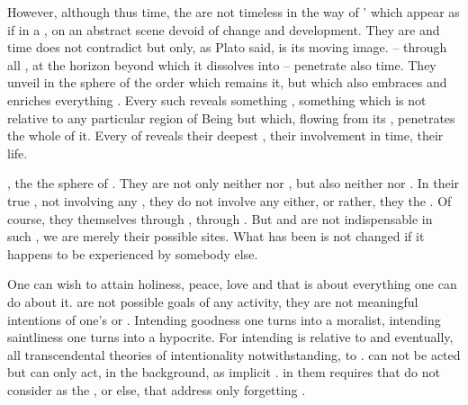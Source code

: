 However, although  thus time, the  are not
timeless in the way of ' which appear as if in a ,
on an abstract scene devoid of change and development.  They are 
and time does not contradict  but only, as Plato said, is its
moving image.
 --  through all , at the horizon
beyond which it dissolves into  -- penetrate also time. They
unveil in the sphere of  the order which remains  it, but
which also embraces and enriches everything . Every such
 reveals something , something which is not
relative to any particular region of Being but which, flowing from its
, penetrates the whole of it. Every  of
 reveals their deepest , their involvement in time,
their life.


\pa 
{}, the   the sphere of
. They are not only neither  nor , but
also neither  nor .  In their true ,
not involving any , they do not involve any  either, or
rather, they  the .
Of course, they  themselves through , through . But
 and  are not indispensable in such , we 
are merely their possible sites. What has been  is not
changed if it happens to be  experienced by somebody
else.

One can wish to attain holiness, peace, love and that is about everything one
can do about it.   are not possible goals of any activity, they
are not meaningful intentions of one's  or . Intending
goodness one turns into a moralist, intending saintliness one turns into a
hypocrite. For intending is relative to  and eventually, all
transcendental theories of intentionality notwithstanding, to .
 can not be acted but can only act, in the background, as
implicit .   in them requires that  do
not consider  as the , or else, that  address
 only forgetting .

